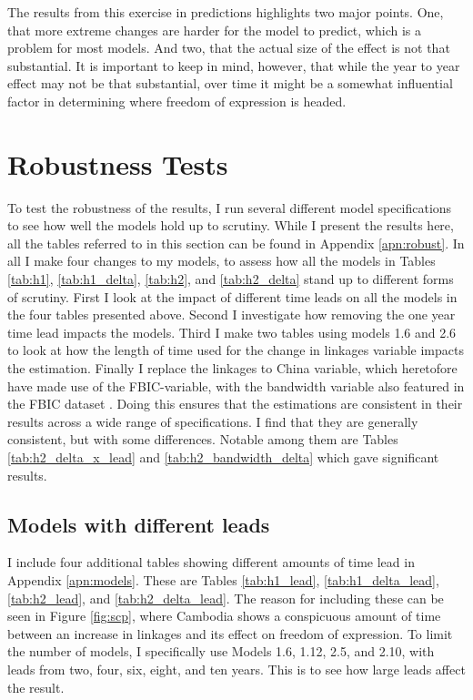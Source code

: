 The results from this exercise in predictions highlights two major points. One, that more extreme changes are harder for the model to predict, which is a problem for most models. And two, that the actual size of the effect is not that substantial. It is important to keep in mind, however, that while the year to year effect may not be that substantial, over time it might be a somewhat influential factor in determining where freedom of expression is headed.

\section{Robustness Tests} \label{sec:robust}
To test the robustness of the results, I run several different model specifications to see how well the models hold up to scrutiny. While I present the results here, all the tables referred to in this section can be found in Appendix \ref{apn:robust}. In all I make four changes to my models, to assess how all the models in Tables \ref{tab:h1}, \ref{tab:h1_delta}, \ref{tab:h2}, and \ref{tab:h2_delta} stand up to different forms of scrutiny. First I look at the impact of different time leads on all the models in the four tables presented above. Second I investigate how removing the one year time lead impacts the models. Third I make two tables using models 1.6 and 2.6 to look at how the length of time used for the change in linkages variable impacts the estimation. Finally I replace the linkages to China variable, which heretofore have made use of the FBIC-variable, with the bandwidth variable also featured in the FBIC dataset \citep{moyer_china-us_2021}. Doing this ensures that the estimations are consistent in their results across a wide range of specifications. I find that they are generally consistent, but with some differences. Notable among them are Tables \ref{tab:h2_delta_x_lead} and \ref{tab:h2_bandwidth_delta} which gave significant results.

\subsection{Models with different leads}
I include four additional tables showing different amounts of time lead in Appendix \ref{apn:models}. These are Tables \ref{tab:h1_lead}, \ref{tab:h1_delta_lead}, \ref{tab:h2_lead}, and \ref{tab:h2_delta_lead}. The reason for including these can be seen in Figure \ref{fig:scp}, where Cambodia shows a conspicuous amount of time between an increase in linkages and its effect on freedom of expression. To limit the number of models, I specifically use Models 1.6, 1.12, 2.5, and 2.10, with leads from two, four, six, eight, and ten years. This is to see how large leads affect the result. 

